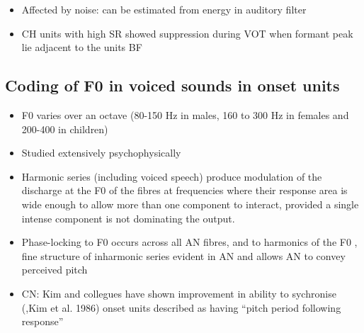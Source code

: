 \documentclass[10pt,a4paper]{article}
\begin{document}
\begin{itemize}
  \begin{itemize}
  \item Affected by noise: can be estimated from energy in auditory filter
  \item CH units with high SR showed suppression during VOT when formant peak
    lie adjacent to the units BF
  \end{itemize}
\end{itemize}

\subsection{Coding of F0 in voiced sounds in onset units \citep{PalmerWinter:1993}}


\begin{itemize}
\item F0 varies over an octave (80-150 Hz in males, 160 to 300 Hz in females and
  200-400 in children)
\item Studied extensively psychophysically \citep{Evans:1978, Greenberg:1980}
\item Harmonic series (including voiced speech) produce modulation of the
  discharge at the F0 of the fibres at frequencies where their response area is
  wide enough to allow more than one component to interact, provided a single
  intense component is not dominating the output.
\item Phase-locking to F0 occurs across all AN fibres, and to harmonics of the
  F0 \citep{MillerSachs:1984,Palmer:1990}, fine structure of inharmonic series
  evident in AN and allows AN to convey perceived pitch \citep{Evans:1978,
    DelgutteKiang:1991}
\item CN: Kim and collegues have shown improvement in ability to sychronise
  \citep{KimLeonard:1988}(,Kim et al. 1986) onset units described as having
  {\textquotedblleft}pitch period following response{\textquotedblright}
\end{itemize}

\subsection{\citep{RecioRhode:2000}}
\end{document}
